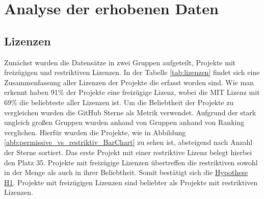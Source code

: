 \newpage %
\chapter{Analyse der erhobenen Daten}


\section{Lizenzen}



\bigskip
\noindent
Zunächst wurden die Datensätze in zwei Gruppen aufgeteilt, Projekte mit freizügigen und restriktiven
Lizenzen. 
In der Tabelle \ref{tab:lizenzen} findet sich eine Zusammenfassung aller Lizenzen der
Projekte die erfasst worden sind. Wie man erkennt haben 91\% der Projekte eine freizügige Lizenz, wobei
die MIT Lizenz mit 69\% die beliebteste aller Lizenzen ist. Um die Beliebtheit der Projekte zu
vergleichen wurden die GitHub Sterne als Metrik verwendet.
Aufgrund der stark ungleich großen Gruppen wurden anhand von Gruppen anhand von Ranking verglichen.
Hierfür wurden die Projekte, wie in Abbildung \ref{abb:permissive_vs_restriktiv_BarChart} zu sehen
ist, absteigend nach Anzahl der Sterne sortiert.
Das erste Projekt mit einer restriktive Lizenz belegt hierbei den Platz 35. Projekte mit freizügige
Lizenzen übertreffen die restriktiven sowohl in der Menge als auch in ihrer Beliebtheit.
%
%
%
%
%
%
Somit bestätigt sich die \hyperref[H:1]{Hypothese H1}. Projekte mit freizügigen Lizenzen sind
beliebter als Projekte mit restriktiven Lizenzen.


